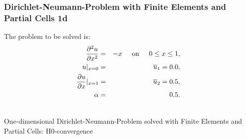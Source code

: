 \documentclass[a4paper,12pt]{article}
\makeatletter
\newenvironment{figurehere}
  {\def\@captype{figure}}
  {}
\makeatother
\begin{document}
\subsubsection{Dirichlet-Neumann-Problem with Finite Elements and Partial Cells 1d}
The problem to be solved is:
\begin{eqnarray}
\frac{\partial^2 u}{\partial x^2} &=& -x \hspace{0.5cm}\text{on}\hspace{0.5cm}0 \leq x\leq 1,\\
u\vert_{x=0} &=& \overline{u}_1 = 0.0,\\
\frac{\partial u}{\partial x}\vert_{x=1} &=& \overline{u}_2 = 0.5,\\
\alpha &=& 0.5.
\end{eqnarray}
\begin{center}
\begin{figurehere}
\\
\caption{One-dimensional Dirichlet-Neumann-Problem solved with Finite Elements and Partial Cells: H$0$-convergence}\label{fig:femneumann1dH0}
\end{figurehere}
\end{center}
\end{document}
